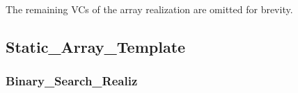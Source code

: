 The remaining VCs of the array realization are omitted for brevity.

	\subsection{Static\_Array\_Template}	%

		\subsubsection{Binary\_Search\_Realiz}	%

